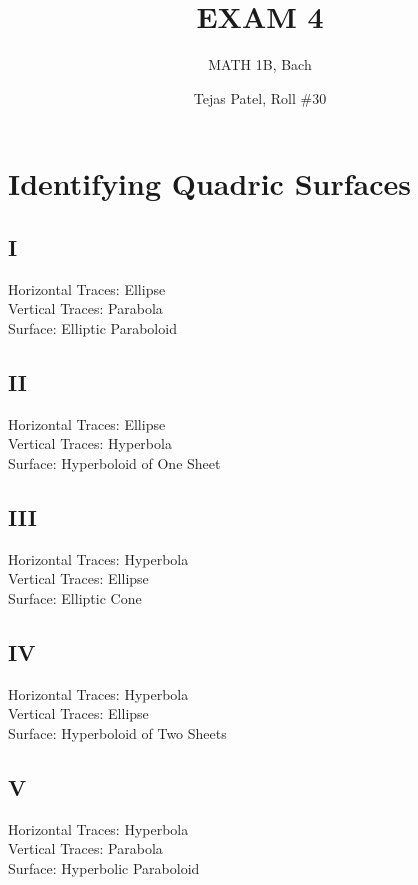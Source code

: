 \documentclass{article}
\title{EXAM 4}
\author{MATH 1B, Bach}
\date{Tejas Patel, Roll \#30}
\begin{document}
\maketitle

    

\section{Identifying Quadric Surfaces}
\subsection*{I}
Horizontal Traces: Ellipse \\Vertical Traces: Parabola \\Surface: Elliptic Paraboloid
\subsection*{II}
Horizontal Traces: Ellipse \\Vertical Traces: Hyperbola \\Surface: Hyperboloid of One Sheet
\subsection*{III}
Horizontal Traces: Hyperbola \\Vertical Traces: Ellipse \\Surface: Elliptic Cone
\subsection*{IV}
Horizontal Traces: Hyperbola \\Vertical Traces: Ellipse \\Surface: Hyperboloid of Two Sheets
\subsection*{V}
Horizontal Traces: Hyperbola \\Vertical Traces: Parabola \\Surface: Hyperbolic Paraboloid
\end{document}

